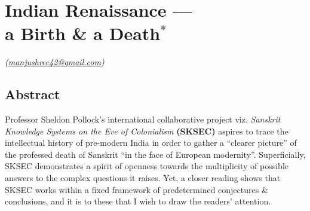 \chapter[Indian Renaissance — a Birth \& a Death]{Indian Renaissance —\\ a Birth \& a Death$^{*}$}\label{chapter\thechapter:begin}


\hfill{\sl(\url{manjushree42@gmail.com})}




\smallskip
\section*{Abstract}

Professor Sheldon Pollock’s international collaborative project viz. {\sl Sanskrit Knowledge Systems on the Eve of Colonialism} {\bf(SKSEC)} aspires to trace the intellectual history of pre-modern India in order to gather a “clearer picture” of the professed death of Sanskrit “in the face of European modernity”. Superficially, SKSEC demonstrates a spirit of openness towards the multiplicity of possible answers to the complex questions it raises. Yet, a closer reading shows that SKSEC works within a fixed framework of predetermined conjectures \& conclusions, and it is to these that I wish to draw the readers’ attention. 

